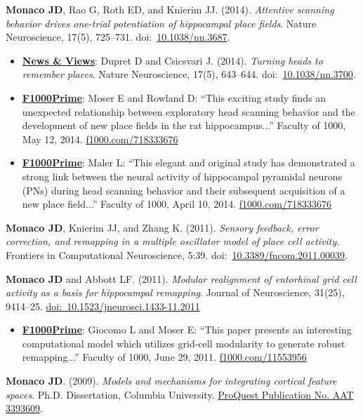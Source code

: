 \documentclass[10pt]{article}
\begin{document}
\begin{description}
\item \textbf{Monaco JD}, Rao G, Roth ED, and Knierim JJ. (2014). \emph{Attentive scanning behavior drives one-trial potentiation of hippocampal place fields}. Nature Neuroscience, 17(5), 725--731. doi:~\href{http://dx.doi.org/10.1038/nn.3687}{10.1038/nn.3687}.
\begin{itemize}
  \item \underline{\bf News \& Views}: Dupret D and Csicsvari J. (2014). \emph{Turning heads to remember places}. Nature Neuroscience, 17(5), 643--644. doi:~\href{http://dx.doi.org/10.1038/nn.3700}{10.1038/nn.3700}.
  \item \underline{\bf F1000Prime}: Moser E and Rowland D: ``This exciting study finds an unexpected relationship between exploratory head scanning behavior and the development of new place fields in the rat hippocampus...'' Faculty of 1000, May 12, 2014. \href{http://f1000prime.com/718333676#eval793494783}{f1000.com/718333676}
  \item \underline{\bf F1000Prime}: Maler L: ``This elegant and original study has demonstrated a strong link between the neural activity of hippocampal pyramidal neurons (PNs) during head scanning behavior and their subsequent acquisition of a new place field...'' Faculty of 1000, April 10, 2014. \href{http://f1000prime.com/718333676#eval793493493}{f1000.com/718333676}
\end{itemize}
\item \textbf{Monaco JD}, Knierim JJ, and Zhang K. (2011). \emph{Sensory feedback, error correction, and remapping in a multiple oscillator model of place cell activity}. Frontiers in Computational Neuroscience, 5:39. doi:~\href{http://dx.doi.org/10.3389/fncom.2011.00039}{10.3389/fncom.2011.00039}.
\item \textbf{Monaco JD} and Abbott LF. (2011). \emph{Modular realignment of entorhinal grid cell activity as a basis for hippocampal remapping}. Journal of Neuroscience, 31(25), 9414--25. \href{http://dx.doi.org/10.1523/JNEUROSCI.1433-11.2011}{doi:~10.1523/jneurosci.1433-11.2011}
\begin{itemize}
    \item \underline{\bf F1000Prime}: Giocomo L and Moser E: ``This paper presents an interesting computational model which utilizes grid-cell modularity to generate robust remapping...'' Faculty of 1000, June 29, 2011. \href{http://f1000.com/11553956}{f1000.com/11553956}
\end{itemize}
\item \textbf{Monaco JD}. (2009). \emph{Models and mechanisms for integrating cortical feature spaces}. Ph.D. Dissertation, Columbia University. \href{http://gradworks.umi.com/33/93/3393609.html}{ProQuest Publication No. AAT 3393609}.

\end{description}
\end{document}
